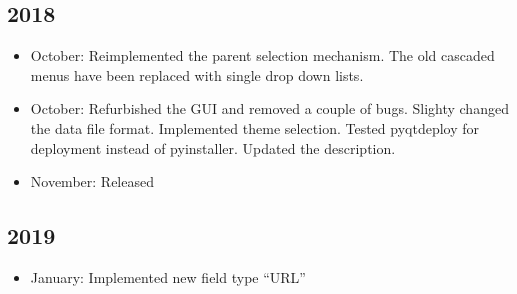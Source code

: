\documentclass[letterpaper,10pt,english]{sphinxmanual}
\begin{document}
\subsection{2018}
\label{\detokenize{releases:id4}}\begin{itemize}
\item {} 
\sphinxAtStartPar
October: Re\sphinxhyphen{}implemented the parent selection mechanism. The old cascaded menus have been replaced with single drop down lists.

\item {} 
\sphinxAtStartPar
October: Re\sphinxhyphen{}furbished the GUI and removed a couple of bugs. Slighty changed the data file format. Implemented theme selection. Tested pyqtdeploy for deployment instead of pyinstaller. Updated the description.

\item {} 
\sphinxAtStartPar
November: Released 

\end{itemize}


\subsection{2019}
\label{\detokenize{releases:id5}}\begin{itemize}
\item {} 
\sphinxAtStartPar
January: Implemented new field type “URL”

\end{itemize}
\end{document}
